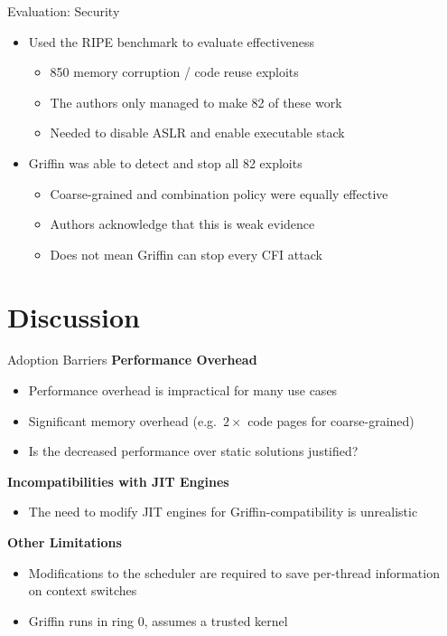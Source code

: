 \documentclass[12pt, dvipsnames, aspectratio=169]{beamer}
\begin{document}
\begin{frame}[c]{Evaluation: Security}{}
  \begin{itemize}
    \item Used the RIPE benchmark to evaluate effectiveness
    \begin{itemize}
      \item 850 memory corruption / code reuse exploits
      \item The authors only managed to make 82 of these work
      \item Needed to disable ASLR and enable executable stack
    \end{itemize}
    \vfill
    \item Griffin was able to detect and stop all 82 exploits
    \begin{itemize}
      \item Coarse-grained and combination policy were equally effective
      \item Authors acknowledge that this is weak evidence
      \item Does not mean Griffin can stop every CFI attack
    \end{itemize}
  \end{itemize}
\end{frame}

\section{Discussion}

\begin{frame}[c]{Adoption Barriers}{}
  {\bf Performance Overhead}
  \begin{itemize}
    \item Performance overhead is impractical for many use cases
    \item Significant memory overhead (e.g.~$2\times$ code pages for coarse-grained)
    \item Is the decreased performance over static solutions justified?
  \end{itemize}

  \vfill
  {\bf Incompatibilities with JIT Engines}
  \begin{itemize}
    \item The need to modify JIT engines for Griffin-compatibility is unrealistic
  \end{itemize}

  \vfill
  {\bf Other Limitations}
  \begin{itemize}
    \item Modifications to the scheduler are required to save per-thread information\\on context switches
    \item Griffin runs in ring 0, assumes a trusted kernel
  \end{itemize}
\end{frame}
\end{document}
